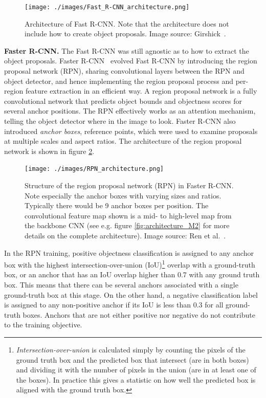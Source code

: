 \documentclass[english,twoside,openright]{HYgraduMLDS}
\begin{document}
\begin{figure}[h] 
\centering
\texttt{[image: ./images/Fast\_R-CNN\_architecture.png]}
\caption{Architecture of Fast R-CNN. Note that the architecture does not include how to create object proposals. Image source: Girshick~\cite{FastRCNN}.}
\label{fig:architecture_Fast_R-CNN} 
\end{figure}

\textbf{Faster R-CNN.} The Fast R-CNN was still agnostic as to how to extract the object proposals. Faster R-CNN~\cite{FasterRCNN} evolved Fast R-CNN by introducing the region proposal network (RPN), sharing convolutional layers between the RPN and object detector, and hence implementing the region proposal process and per-region feature extraction in an efficient way. A region proposal network is a fully convolutional network that predicts object bounds and objectness scores for several anchor positions. The RPN effectively works as an attention mechanism, telling the object detector where in the image to look. Faster R-CNN also introduced \textit{anchor boxes}, reference points, which were used to examine proposals at multiple scales and aspect ratios. The architecture of the region proposal network is shown in figure \ref{fig:architecture_RPN}.

\begin{figure}[h] 
\centering
\texttt{[image: ./images/RPN\_architecture.png]}
\caption{Structure of the region proposal network (RPN) in Faster R-CNN. Note especially the anchor boxes with varying sizes and ratios. Typically there would be 9 anchor boxes per position. The convolutional feature map shown is a mid- to high-level map from the backbone CNN (see e.g. figure \ref{fig:architecture_M2} for more details on the complete architecture). Image source: Ren et al.~\cite{FasterRCNN}.}
\label{fig:architecture_RPN} 
\end{figure}

In the RPN training, positive objectness classification is assigned to any anchor box with the highest intersection-over-union (IoU)\footnote{\textit{Intersection-over-union} is calculated simply by counting the pixels of the ground truth box and the predicted box that intersect (are in both boxes) and dividing it with the number of pixels in the union (are in at least one of the boxes). In practice this gives a statistic on how well the predicted box is aligned with the ground truth box.} overlap with a ground-truth box, or an anchor that has an IoU overlap higher than 0.7 with any ground truth box. This means that there can be several anchors associated with a single ground-truth box at this stage. On the other hand, a negative classification label is assigned to any non-positive anchor if its IoU is less than 0.3 for all ground-truth boxes. Anchors that are not either positive nor negative do not contribute to the training objective.
\end{document}
